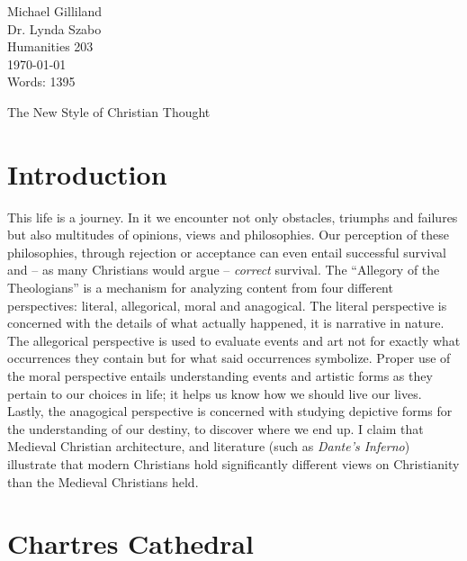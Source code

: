 \documentclass[12pt]{article}
\begin{document}
\begin{flushleft}

Michael Gilliland \\
Dr. Lynda Szabo \\
Humanities 203 \\
\today \\
Words: 1395 \\

\begin{center}
{\large The New Style of Christian Thought}
\end{center}

\setlength{\parindent}{0.5in} 


\section{Introduction}

This life is a journey. In it we encounter not only obstacles, triumphs and
failures but also multitudes of opinions, views and philosophies. Our 
perception of these philosophies, through rejection or acceptance can even 
entail successful survival and -- as many Christians would argue -- 
\emph{correct} survival. The ``Allegory of the Theologians'' is a mechanism
for analyzing content from four different perspectives: literal, allegorical,
moral and anagogical. The literal perspective is concerned with the details of
what actually happened, it is narrative in nature. The allegorical perspective
is used to evaluate events and art not for exactly what occurrences they contain but for
what said occurrences symbolize. Proper use of the moral perspective
entails understanding events and artistic forms as they pertain to our choices in life;
it helps us know how we should live our lives. Lastly, the anagogical perspective is
concerned with studying depictive forms for the understanding of our destiny,
to discover where we end up. I claim that Medieval Christian architecture, and
literature (such as \emph{Dante's Inferno}) illustrate that modern Christians
hold significantly different views on Christianity than the Medieval
Christians held.

\section{Chartres Cathedral}


\end{flushleft}
\end{document}

